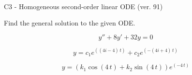 \begin{exercise}
  \begin{exerciseTitle}C3 - Homogeneous second-order linear ODE (ver. 91)\end{exerciseTitle}
  \begin{exerciseStatement}
    
Find the general solution to the given ODE.

    
\[y''+8y'+32y = 0\]

  \end{exerciseStatement}
  \begin{exerciseAnswer}
    
\[y= c_{1} e^{\left(\left(4 i - 4\right) \, t\right)} + c_{2} e^{\left(-\left(4 i + 4\right) \, t\right)}\]

    
\[y= {\left(k_{1} \cos\left(4 \, t\right) + k_{2} \sin\left(4 \, t\right)\right)} e^{\left(-4 \, t\right)}\]

  \end{exerciseAnswer}
\end{exercise}
